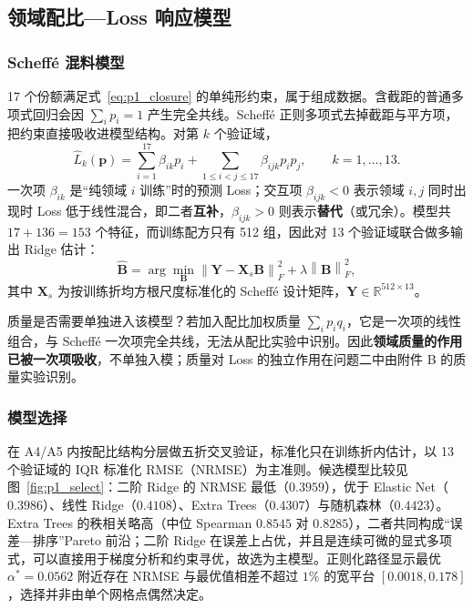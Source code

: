 \subsection{领域配比—Loss 响应模型}

\subsubsection{Scheff\'e 混料模型}

17 个份额满足式~\eqref{eq:p1_closure} 的单纯形约束，属于组成数据\cite{aitchison1982statistical}。含截距的普通多项式回归会因 $\sum_ip_i=1$ 产生完全共线。Scheff\'e 正则多项式\cite{scheffe1958mixtures,cornell2002mixtures}去掉截距与平方项，把约束直接吸收进模型结构。对第 $k$ 个验证域，
\begin{equation}
\widehat L_k(\boldsymbol p)=\sum_{i=1}^{17}\beta_{ik}p_i+\sum_{1\le i<j\le17}\beta_{ijk}p_ip_j,\qquad k=1,\ldots,13 .
\label{eq:p1_scheffe}
\end{equation}
一次项 $\beta_{ik}$ 是“纯领域 $i$ 训练”时的预测 Loss；交互项 $\beta_{ijk}<0$ 表示领域 $i,j$ 同时出现时 Loss 低于线性混合，即二者\textbf{互补}，$\beta_{ijk}>0$ 则表示\textbf{替代}（或冗余）。模型共 $17+136=153$ 个特征，而训练配方只有 512 组，因此对 13 个验证域联合做多输出 Ridge 估计\cite{hoerl1970ridge}：
\begin{equation}
\widehat{\boldsymbol B}=\arg\min_{\boldsymbol B}\left\|\boldsymbol Y-\boldsymbol X_s\boldsymbol B\right\|_F^2+\lambda\left\|\boldsymbol B\right\|_F^2,
\label{eq:p1_ridge}
\end{equation}
其中 $\boldsymbol X_s$ 为按训练折均方根尺度标准化的 Scheff\'e 设计矩阵，$\boldsymbol Y\in\mathbb R^{512\times13}$。

质量是否需要单独进入该模型？若加入配比加权质量 $\sum_ip_iq_i$，它是一次项的线性组合，与 Scheff\'e 一次项完全共线，无法从配比实验中识别。因此\textbf{领域质量的作用已被一次项吸收}，不单独入模；质量对 Loss 的独立作用在问题二中由附件 B 的质量实验识别。

\subsubsection{模型选择}

在 A4/A5 内按配比结构分层做五折交叉验证，标准化只在训练折内估计，以 13 个验证域的 IQR 标准化 RMSE（NRMSE）为主准则。候选模型比较见图~\ref{fig:p1_select}：二阶 Ridge 的 NRMSE 最低（$0.3959$），优于 Elastic Net（$0.3986$）、线性 Ridge（$0.4108$）、Extra Trees（$0.4307$）与随机森林（$0.4423$）。Extra Trees 的秩相关略高（中位 Spearman $0.8545$ 对 $0.8285$），二者共同构成“误差—排序”Pareto 前沿；二阶 Ridge 在误差上占优，并且是连续可微的显式多项式，可以直接用于梯度分析和约束寻优，故选为主模型。正则化路径显示最优 $\alpha^*=0.0562$ 附近存在 NRMSE 与最优值相差不超过 $1\%$ 的宽平台 $[0.0018,0.178]$，选择并非由单个网格点偶然决定。

